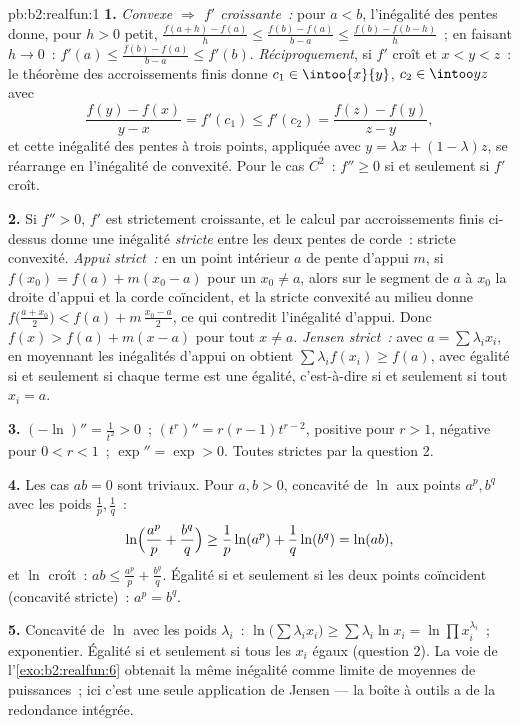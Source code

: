 \begin{solution}{pb:b2:realfun:1}
\textbf{1.} \emph{Convexe $\Rightarrow$ $f'$ croissante~:} pour $a <
b$, l'inégalité des pentes donne, pour $h > 0$ petit, $\frac{f(a+h)
- f(a)}h \leq \frac{f(b) - f(a)}{b-a} \leq \frac{f(b) -
f(b-h)}{h}$~; en faisant $h \to 0$~: $f'(a) \leq \frac{f(b) -
f(a)}{b - a} \leq f'(b)$. \emph{Réciproquement}, si $f'$ croît et
$x < y < z$~: le théorème des accroissements finis donne $c_1 \in
\intoo{x}{y}$, $c_2 \in \intoo yz$ avec
\[
\frac{f(y) - f(x)}{y - x} = f'(c_1) \leq f'(c_2)
= \frac{f(z) - f(y)}{z - y},
\]
et cette inégalité des pentes à trois points, appliquée avec $y =
\lambda x + (1 - \lambda)z$, se réarrange en l'inégalité de
convexité. Pour le cas $C^2$~: $f'' \geq 0$ si et seulement si $f'$
croît.

\textbf{2.} Si $f'' > 0$, $f'$ est strictement croissante, et le
calcul par accroissements finis ci-dessus donne une inégalité
\emph{stricte} entre les deux pentes de corde~: stricte convexité.
\emph{Appui strict~:} en un point intérieur $a$ de pente d'appui $m$,
si $f(x_0) = f(a) + m(x_0 - a)$ pour un $x_0 \neq a$, alors sur le
segment de $a$ à $x_0$ la droite d'appui et la corde coïncident, et
la stricte convexité au milieu donne $f\bigl(\frac{a +
x_0}2\bigr) < f(a) + m\,\frac{x_0 - a}2$, ce qui contredit
l'inégalité d'appui. Donc $f(x) > f(a) + m(x - a)$ pour tout $x \neq
a$. \emph{Jensen strict~:} avec $a = \sum\lambda_ix_i$, en moyennant
les inégalités d'appui on obtient $\sum\lambda_if(x_i) \geq f(a)$,
avec égalité si et seulement si chaque terme est une égalité,
c'est-à-dire si et seulement si tout $x_i = a$.

\textbf{3.} $(-\ln)'' = \frac1{t^2} > 0$~; $(t^r)'' = r(r -
1)t^{r-2}$, positive pour $r > 1$, négative pour $0 < r < 1$~;
$\exp'' = \exp > 0$. Toutes strictes par la question 2.

\textbf{4.} Les cas $ab = 0$ sont triviaux. Pour $a, b > 0$,
concavité de $\ln$ aux points $a^p, b^q$ avec les poids
$\frac1p, \frac1q$~:
\[
\ln\Bigl(\frac{a^p}p + \frac{b^q}q\Bigr) \geq
\frac1p\ln(a^p) + \frac1q\ln(b^q) = \ln(ab),
\]
et $\ln$ croît~: $ab \leq \frac{a^p}p + \frac{b^q}q$.
Égalité si et seulement si les deux points coïncident (concavité
stricte)~: $a^p = b^q$.

\textbf{5.} Concavité de $\ln$ avec les poids $\lambda_i$~:
$\ln\bigl(\sum\lambda_ix_i\bigr) \geq \sum\lambda_i\ln x_i =
\ln\prod x_i^{\lambda_i}$~; exponentier. Égalité si et seulement si
tous les $x_i$ égaux (question 2). La voie de l'\cref{exo:b2:realfun:6}
obtenait la même inégalité comme limite de moyennes de puissances~;
ici c'est une seule application de Jensen --- la boîte à outils a de
la redondance intégrée.


\end{solution}
